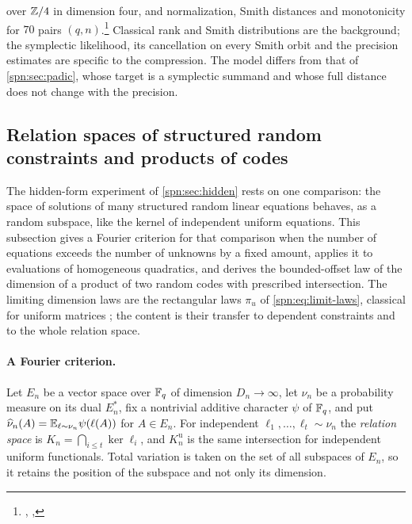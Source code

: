 over $\mathbb{Z}/4$ in dimension four, and normalization, Smith distances and monotonicity for $70$ pairs
$(q,n)$.\footnote{\raggedright{},
,
}
Classical rank and Smith distributions \cite{Fulman2015Stein,WangStanley2017Smith} are the background;
the symplectic likelihood, its cancellation on every Smith orbit and the precision estimates are
specific to the compression. The model differs from that of \cref{spn:sec:padic}, whose target is a
symplectic summand and whose full distance does not change with the precision.


\subsection{Relation spaces of structured random constraints and products of codes}\label{spn:sec:relations}

The hidden-form experiment of \cref{spn:sec:hidden} rests on one comparison: the space of solutions of
many structured random linear equations behaves, as a random subspace, like the kernel of independent
uniform equations. This subsection gives a Fourier criterion for that comparison when the number of
equations exceeds the number of unknowns by a fixed amount, applies it to evaluations of homogeneous
quadratics, and derives the bounded-offset law of the dimension of a product of two random codes with
prescribed intersection. The limiting dimension laws are the rectangular laws $\pi_u$ of
\eqref{spn:eq:limit-laws}, classical for uniform matrices \cite{Gerth1986Limit,Fulman2015Stein}; the
content is their transfer to dependent constraints and to the whole relation space.

\paragraph{A Fourier criterion.}
Let $E_n$ be a vector space over $\mathbb{F}_q$ of dimension $D_n\to\infty$, let $\nu_n$ be a probability
measure on its dual $E_n^*$, fix a nontrivial additive character $\psi$ of $\mathbb{F}_q$, and put
$\widehat\nu_n(A)=\mathbb{E}_{\ell\sim\nu_n}\psi(\ell(A))$ for $A\in E_n$. For independent
$\ell_1,\dots,\ell_t\sim\nu_n$ the \emph{relation space} is $K_n=\bigcap_{i\le t}\ker\ell_i$, and
$K_n^{\mathrm u}$ is the same intersection for independent uniform functionals. Total variation is
taken on the set of all subspaces of $E_n$, so it retains the position of the subspace and not only
its dimension.


